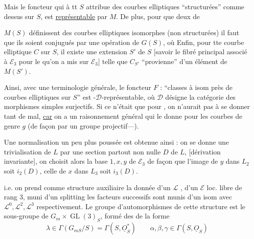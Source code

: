 Mais le foncteur qui à tt $S$ attribue   des courbes elliptiques ``structurées'' comme dessus sur $S$, est \uline{représentable} par $M$. De plus, pour que deux  de


$M(S)$ définissent des courbes elliptiques isomorphes (non structurées) il faut que  ils soient conjugués par une opération de $G(S)$, où  Enfin, pour tte courbe elliptique $C$ sur $S$, il existe une extension  $S'$ de $S$ [savoir le fibré principal associé à $\mathcal E_3$ pour le  qu'on a mis sur $\mathcal E_3$] telle que  $C_{S'}$ ``provienne'' d'un élément de $M(S')$.

Ainsi, avec une terminologie générale, le foncteur $F$ : ``classes à isom près de courbes elliptiques sur $S$'' est -$\mathcal D$-représentable, où $\mathcal D$ désigne la catégorie des morphismes simples surjectifs. Si ce n'était que pour , on n'aurait pas à se donner tant de mal, \uline{car} on a un raisonnement général qui le donne pour les courbes de genre $g$  (de façon   par un groupe projectif---).


Une normalisation un peu plus poussée est obtenue ainsi : on se donne une trivialisation de $L$ par une section partout non nulle $D$ de $L$, [dérivation invariante], on choisit alors la base $1,x,y$ de $\mathcal E_3$ de façon que l'image de $y$ dans $L_2$ soit $i_2(D)$, celle de $x$ dans $L_3$ soit $i_3(D)$. 

\deleted{[} i.e. on prend comme structure auxiliaire la donnée d'un $\mathcal L$ , d'un $\mathcal E$ loc. libre de rang $3$, muni d'un splitting  les facteurs successifs sont munis d'un isom avec $\mathcal L^0,\mathcal L^2,\mathcal L^3$ respectivement.
Le groupe d'automorphismes de cette structure est  le sous-groupe de $G_m\times\operatorname{GL}(3)_S$, formé des  de la forme
\[
\lambda\in\Gamma(G_{mS}/S)=\Gamma(S,\underline O_S^*)\qquad
\alpha,\beta,\gamma\in\Gamma(S,\underline O_S)
\]

